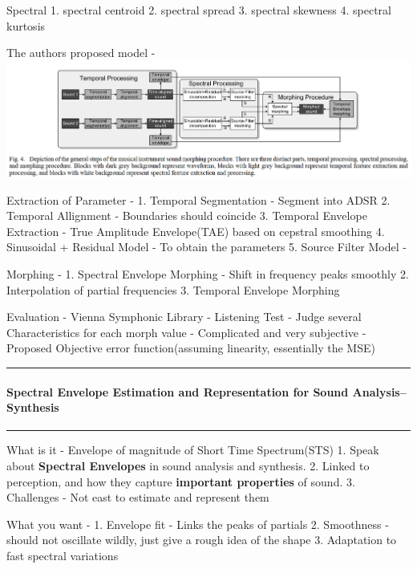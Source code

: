 \documentclass[11pt]{article}
\makeatletter
\def\maxwidth{\ifdim\Gin@nat@width>\linewidth\linewidth
    \else\Gin@nat@width\fi}
\let\Oldincludegraphics\includegraphics
\renewcommand{\includegraphics}[1]{\Oldincludegraphics[width=.8\maxwidth]{#1}}
\makeatother
\begin{document}
Spectral 1. spectral centroid 2. spectral spread 3. spectral skewness 4.
spectral kurtosis

The authors proposed model - \includegraphics{fig_11.PNG}

    Extraction of Parameter - 1. Temporal Segmentation - Segment into ADSR
2. Temporal Allignment - Boundaries should coincide 3. Temporal Envelope
Extraction - True Amplitude Envelope(TAE) based on cepstral smoothing 4.
Sinusoidal + Residual Model - To obtain the parameters 5. Source Filter
Model -

Morphing - 1. Spectral Envelope Morphing - Shift in frequency peaks
smoothly 2. Interpolation of partial frequencies 3. Temporal Envelope
Morphing

    Evaluation - Vienna Symphonic Library - Listening Test - Judge several
Characteristics for each morph value - Complicated and very subjective -
Proposed Objective error function(assuming linearity, essentially the
MSE)

    \begin{center}\rule{0.5\linewidth}{\linethickness}\end{center}

\paragraph{Spectral Envelope Estimation and Representation for Sound
Analysis--Synthesis}\label{spectral-envelope-estimation-and-representation-for-sound-analysissynthesis}

\begin{center}\rule{0.5\linewidth}{\linethickness}\end{center}

    What is it - Envelope of magnitude of Short Time Spectrum(STS) 1. Speak
about \textbf{Spectral Envelopes} in sound analysis and synthesis. 2.
Linked to perception, and how they capture \textbf{important properties}
of sound. 3. Challenges - Not east to estimate and represent them

    What you want - 1. Envelope fit - Links the peaks of partials 2.
Smoothness - should not oscillate wildly, just give a rough idea of the
shape 3. Adaptation to fast spectral variations
\end{document}
